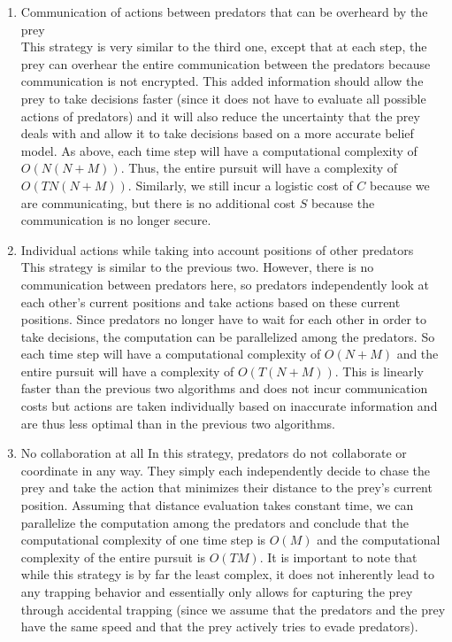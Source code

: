 \documentclass[11pt]{article}
\begin{document}
\begin{multicols}{2}
\begin{enumerate}[leftmargin=0.25cm]
	\item Communication of actions between predators that can be overheard by the prey\\
	This strategy is very similar to the third one, except that at each step, the prey can overhear the entire communication between the predators because communication is not encrypted. This added information should allow the prey to take decisions faster (since it does not have to evaluate all possible actions of predators) and it will also reduce the uncertainty that the prey deals with and allow it to take decisions based on a more accurate belief model. As above, each time step will have a computational complexity of $O(N(N+M))$. Thus, the entire pursuit will have a complexity of $O(TN(N+M))$. Similarly, we still incur a logistic cost of $C$ because we are communicating, but there is no additional cost $S$ because the communication is no longer secure. 
	
	\item Individual actions while taking into account positions of other predators\\
	This strategy is similar to the previous two. However, there is no communication between predators here, so predators independently look at each other's current positions and take actions based on these current positions. Since predators no longer have to wait for each other in order to take decisions, the computation can be parallelized among the predators. So each time step will have a computational complexity of $O(N+M)$ and the entire pursuit will have a complexity of $O(T(N+M))$. This is linearly faster than the previous two algorithms and does not incur communication costs but actions are taken individually based on inaccurate information and are thus less optimal than in the previous two algorithms. 
	
	\item No collaboration at all
	In this strategy, predators do not collaborate or coordinate in any way. They simply each independently decide to chase the prey and take the action that minimizes their distance to the prey's current position. Assuming that distance evaluation takes constant time, we can parallelize the computation among the predators and conclude that the computational complexity of one time step is $O(M)$ and the computational complexity of the entire pursuit is $O(TM)$. It is important to note that while this strategy is by far the least complex, it does not inherently lead to any trapping behavior and essentially only allows for capturing the prey through accidental trapping (since we assume that the predators and the prey have the same speed and that the prey actively tries to evade predators).  
\end{enumerate}


\end{multicols}
\end{document}
